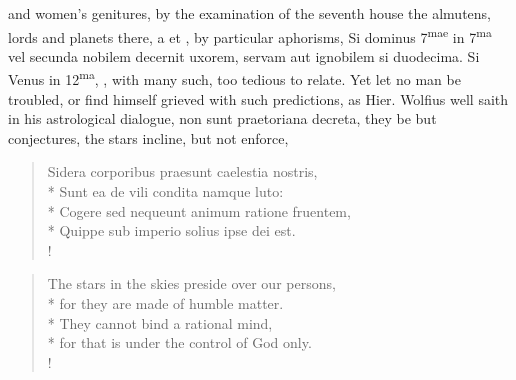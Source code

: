 and women's genitures, by the examination of the seventh house the
almutens, lords and planets there, a \leftmoon{} et \astrosun{} \etc{}, by particular
aphorisms, Si dominus 7\textsuperscript{mae} in 7\textsuperscript{ma} vel secunda nobilem decernit uxorem,
servam aut ignobilem si duodecima. Si Venus in 12\textsuperscript{ma}, \etc{}, with many
such, too tedious to relate. Yet let no man be troubled, or find
himself grieved with such predictions, as Hier. Wolfius well saith in
his astrological dialogue, non sunt praetoriana decreta, they be
but conjectures, the stars incline, but not enforce,
%
\begin{latin}
\begin{verse}%
Sidera corporibus praesunt caelestia nostris,\\*
Sunt ea de vili condita namque luto:\\*
Cogere sed nequeunt animum ratione fruentem,\\*
Quippe sub imperio solius ipse dei est.\\!
\end{verse}%
\end{latin}
\translationrule%
\begin{verse}%
The stars in the skies preside over our persons,\\*
for they are made of humble matter.\\*
They cannot bind a rational mind,\\*
for that is under the control of God only.\\!
\end{verse}%

